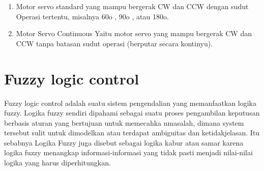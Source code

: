 \begin{enumerate}
\item Motor servo standard yang mampu bergerak CW dan CCW dengan sudut Operasi tertentu, misalnya 60o , 90o , atau 180o.
\item Motor Servo Continuous Yaitu motor servo yang mampu bergerak CW dan CCW tanpa batasan sudut operasi (berputar secara kontinyu).
\end{enumerate}
\section{Fuzzy logic control}
Fuzzy logic control adalah suatu sistem pengendalian yang memanfaatkan logika fuzzy. Logika fuzzy sendiri dipahami sebagai suatu proses pengambilan keputusan berbasis aturan yang bertujuan untuk memecahka nmasalah, dimana system tersebut sulit untuk dimodelkan atau terdapat ambiguitas dan ketidakjelasan. Itu sebabnya Logika Fuzzy juga disebut sebagai logika kabur atau samar karena logika fuzzy menangkap informasi-informasi yang tidak pasti menjadi nilai-nilai logika yang harus diperhitungkan.
